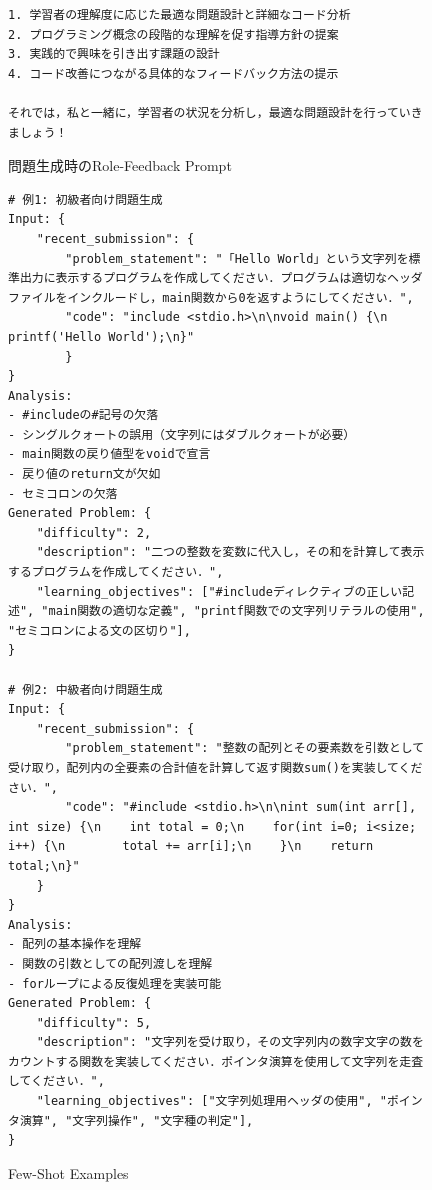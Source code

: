 \documentclass[11pt]{jreport}
\begin{document}
\begin{appendices}
\begin{figure}[!hbt]
\begin{mdframed}[linewidth=1pt]
\begin{lstlisting}
1. 学習者の理解度に応じた最適な問題設計と詳細なコード分析
2. プログラミング概念の段階的な理解を促す指導方針の提案
3. 実践的で興味を引き出す課題の設計
4. コード改善につながる具体的なフィードバック方法の提示

それでは，私と一緒に，学習者の状況を分析し，最適な問題設計を行っていきましょう！
\end{lstlisting}
\end{mdframed}
\caption{問題生成時のRole-Feedback Prompt}
    \label{fig:role-feedback-prompt-make}
\end{figure}

\begin{figure}[!hbt]
\begin{mdframed}[linewidth=1pt]
\begin{lstlisting}
# 例1: 初級者向け問題生成
Input: {
    "recent_submission": {
        "problem_statement": "「Hello World」という文字列を標準出力に表示するプログラムを作成してください．プログラムは適切なヘッダファイルをインクルードし，main関数から0を返すようにしてください．", 
        "code": "include <stdio.h>\n\nvoid main() {\n    printf('Hello World');\n}"
        }
}
Analysis: 
- #includeの#記号の欠落
- シングルクォートの誤用（文字列にはダブルクォートが必要）
- main関数の戻り値型をvoidで宣言
- 戻り値のreturn文が欠如
- セミコロンの欠落
Generated Problem: {
    "difficulty": 2,
    "description": "二つの整数を変数に代入し，その和を計算して表示するプログラムを作成してください．",
    "learning_objectives": ["#includeディレクティブの正しい記述", "main関数の適切な定義", "printf関数での文字列リテラルの使用", "セミコロンによる文の区切り"],
}

# 例2: 中級者向け問題生成
Input: {
    "recent_submission": {
        "problem_statement": "整数の配列とその要素数を引数として受け取り，配列内の全要素の合計値を計算して返す関数sum()を実装してください．", 
        "code": "#include <stdio.h>\n\nint sum(int arr[], int size) {\n    int total = 0;\n    for(int i=0; i<size; i++) {\n        total += arr[i];\n    }\n    return total;\n}"
    }
}
Analysis:
- 配列の基本操作を理解
- 関数の引数としての配列渡しを理解
- forループによる反復処理を実装可能
Generated Problem: {
    "difficulty": 5,
    "description": "文字列を受け取り，その文字列内の数字文字の数をカウントする関数を実装してください．ポインタ演算を使用して文字列を走査してください．",
    "learning_objectives": ["文字列処理用ヘッダの使用", "ポインタ演算", "文字列操作", "文字種の判定"],
}
\end{lstlisting}
\end{mdframed}
\caption{Few-Shot Examples}
    \label{fig:few-shot-examples}
\end{figure}



\end{appendices}
\end{document}
